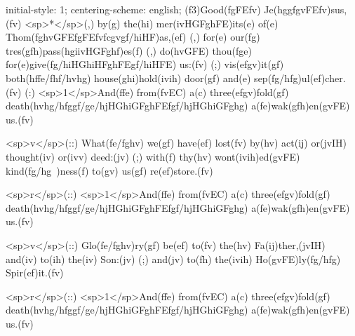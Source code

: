 initial-style: 1;
centering-scheme: english;
(f3)Good(fgFEfv) Je(hggfgvFEfv)sus,(fv) <sp>*</sp>(,) by(g) the(hi) mer(ivHGFghFE)its(e) of(e) Thom(fghvGFEfgFEfvfcgvgf/hiHF)as,(ef) (,) for(e) our(fg) tres(gfh)pass(hgiivHGFghf)es(f) (,) do(hvGFE) thou(fge) for(e)give(fg/hiHGhiHFghFEgf/hiHFE) us:(fv) (;) vis(efgv)it(gf) both(hffe/fhf/hvhg) house(ghi)hold(ivih) door(gf) and(e) sep(fg/hfg)ul(ef)cher.(fv) (:) <sp>1</sp>And(ffe) from(fvEC) a(c) three(efgv)fold(gf) death(hvhg/hfggf/ge/hjHGhiGFghFEfgf/hjHGhiGFghg) a(fe)wak(gfh)en(gvFE) us.(fv)

<sp>v</sp>(::) What(fe/fghv) we(gf) have(ef) lost(fv) by(hv) act(ij) or(jvIH) thought(iv) or(ivv) deed:(jv) (;) with(f) thy(hv) wont(ivih)ed(gvFE) kind(fg/hg~)ness(f) to(gv) us(gf) re(ef)store.(fv)

<sp>r</sp>(::) <sp>1</sp>And(ffe) from(fvEC) a(c) three(efgv)fold(gf) death(hvhg/hfggf/ge/hjHGhiGFghFEfgf/hjHGhiGFghg) a(fe)wak(gfh)en(gvFE) us.(fv)

<sp>v</sp>(::) Glo(fe/fghv)ry(gf) be(ef) to(fv) the(hv) Fa(ij)ther,(jvIH) and(iv) to(ih) the(iv) Son:(jv) (;) and(jv) to(fh) the(ivih) Ho(gvFE)ly(fg/hfg) Spir(ef)it.(fv)

<sp>r</sp>(::) <sp>1</sp>And(ffe) from(fvEC) a(c) three(efgv)fold(gf) death(hvhg/hfggf/ge/hjHGhiGFghFEfgf/hjHGhiGFghg) a(fe)wak(gfh)en(gvFE) us.(fv)